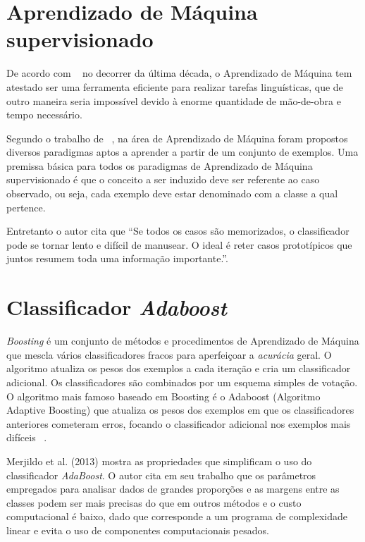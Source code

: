 \section{Aprendizado de Máquina supervisionado}

De acordo com ~\cite{de2005anotaccao} no decorrer da última década, o Aprendizado de Máquina tem atestado ser uma ferramenta eficiente para realizar tarefas linguísticas, que de outro maneira seria impossível devido à enorme quantidade de mão-de-obra e tempo necessário. 

Segundo o trabalho de ~\cite{batista2003pre}, na área de Aprendizado de Máquina foram propostos diversos paradigmas aptos a aprender a partir de um conjunto de exemplos. Uma premissa básica para todos os paradigmas de Aprendizado de Máquina supervisionado é que o conceito a ser induzido deve ser referente ao caso observado, ou seja, cada exemplo deve estar denominado com a classe a qual pertence. 

Entretanto o autor cita que ``Se todos os casos são memorizados, o classificador pode se tornar lento e difícil de manusear. O ideal é reter casos prototípicos que juntos resumem toda uma informação importante.''.

\section{Classificador \textit{Adaboost}}

\textit{Boosting} é um conjunto de métodos e procedimentos de Aprendizado de Máquina que mescla vários classificadores fracos para aperfeiçoar a \textit{acurácia} geral. O algoritmo atualiza os pesos dos exemplos a cada iteração e cria um classificador adicional. Os classificadores são combinados por um esquema simples de votação. O algoritmo mais famoso baseado em Boosting é o Adaboost (Algoritmo Adaptive Boosting) que atualiza os pesos dos exemplos em que os classificadores anteriores cometeram erros, focando o classificador adicional nos exemplos mais difíceis ~\cite {duarte2009algoritmo}.

Merjildo et al. (2013) mostra as propriedades que simplificam o uso do classificador \textit{AdaBoost}. O autor cita em seu trabalho que os parâmetros empregados para analisar dados de grandes proporções e as margens entre as classes podem ser mais precisas do que em outros métodos e o custo computacional é baixo, dado que corresponde a um programa de complexidade linear e evita o uso de componentes computacionais pesados.

